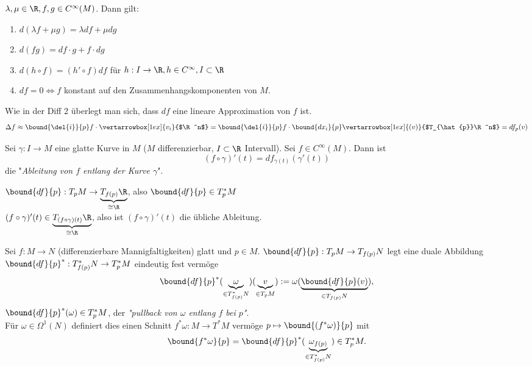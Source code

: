 \lecture
\begin{rem*}
	$ \lambda,\mu \in \R, f,g \in C^\infty(M) $. Dann gilt:
	\begin{enumerate}[label={\roman*})]
		\item $ d(\lambda f + \mu g)= \lambda df + \mu dg $
		\item $ d(fg) = df \cdot g + f \cdot dg $
		\item $ d(h \circ f) = (h' \circ f)df $ für $ h: I \to \R, h \in C^\infty, I \subset \R $
		\item $ df=0 \iff f $ konstant auf den Zusammenhangskomponenten von $M$.
	\end{enumerate}
\end{rem*}

\begin{rem*}
	Wie in der Diff 2 überlegt man sich, dass $df$ eine lineare Approximation von $f$ ist.
	\[ \Delta f \approx \bound{\del{i}}{p} f \cdot \vertarrowbox[1ex]{v_i}{$\R^n$} = \bound{\del{i}}{p} f \cdot \bound{dx_i}{p} \vertarrowbox[1ex]{(v)}{$T_{\hat{p}}\R^n$} = df_p(v) \]
\end{rem*}

\begin{defn}
	Sei $ \gamma: I \to M $ eine glatte Kurve in $M$ ($M$ differenzierbar, $I \subset \R$ Intervall). Sei $f \in C^\infty(M)$. Dann ist
	\[ (f \circ \gamma)'(t) = df_{\gamma(t)}(\gamma'(t)) \]
	die "\emph{Ableitung von $f$ entlang der Kurve $\gamma$}".
\end{defn}

\begin{rem*}
	$ \bound{df}{p}: T_pM \to \underbrace{T_{f(p)}\R}_{\cong \R} $, also $ \bound{df}{p} \in T_p^*M $\\
	$ (f \circ \gamma)'(t) \in \underbrace{T_{(f \circ \gamma) (t)}\R}_{\cong \R} $, also ist $(f \circ \gamma)'(t)$ die übliche Ableitung.
\end{rem*}

\begin{defn}[Pullback]
	Sei $ f: M \to N $ (differenzierbare Mannigfaltigkeiten) glatt und $p \in M$. $ \bound{df}{p}: T_pM \to T_{f(p)}N $ legt eine duale Abbildung $ \bound{df}{p}^*: T_{f(p)}^*N \to T_p^*M $ eindeutig fest vermöge
	\[ \bound{df}{p}^*(\underbrace{\omega}_{\in T_{f(p)}^*N})(\underbrace{v}_{\in T_pM}) := \omega(\underbrace{\bound{df}{p}(v)}_{\in T_{f(p)}N}), \]
	$ \bound{df}{p}^* (\omega) \in T_p^*M $, der \emph{"pullback von $\omega$ entlang $f$ bei $p$"}.\\
	Für $\omega \in \Omega^1(N)$ definiert dies einen Schnitt $ f^*\omega: M \to T^*M $ vermöge $ p \mapsto \bound{(f^*\omega)}{p} $ mit
	\[ \bound{f^*\omega}{p} = \bound{df}{p}^* (\underbrace{\omega_{f(p)}}_{\in T_{f(p)}^*N}) \in T_p^*M. \]
\end{defn}

